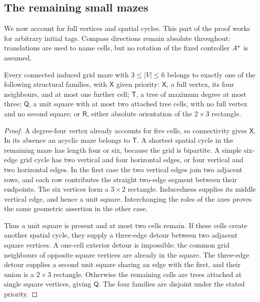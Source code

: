 \subsection{The remaining small mazes}\label{sec:cyclic}

We now account for full vertices and spatial cycles. This part of the proof
works for arbitrary initial tags. Compass directions remain absolute
throughout: translations are used to name cells, but no rotation of the fixed
controller \(A^{\star}\) is assumed.

\begin{lemma}\label{c:geometry}
Every connected induced grid maze with \(3\le |V|\le6\) belongs to exactly one
of the following structural families, with \(\mathsf X\) given priority:
\(\mathsf X\), a full vertex, its four neighbours, and at most one further
cell; \(\mathsf T\), a tree of maximum degree at most three;
\(\mathsf Q\), a unit square with at most two attached tree cells, with no
full vertex and no second square; or \(\mathsf R\), either absolute
orientation of the \(2\times3\) rectangle.
\end{lemma}
\begin{proof}
A degree-four vertex already accounts for five cells, so connectivity gives
\(\mathsf X\). In its absence an acyclic maze belongs to \(\mathsf T\).
A shortest spatial cycle in the remaining maze has length four or six,
because the grid is bipartite. A simple six-edge grid cycle has two vertical
and four horizontal edges, or four vertical and two horizontal edges. In the
first case the two vertical edges join two adjacent rows, and each row
contributes the straight two-edge segment between their endpoints. The six
vertices form a \(3\times2\) rectangle. Inducedness supplies its middle
vertical edge, and hence a unit square. Interchanging the roles of the axes
proves the same geometric assertion in the other case.

Thus a unit square is present and at most two cells remain. If these cells
create another spatial cycle, they supply a three-edge detour between two
adjacent square vertices. A one-cell exterior detour is impossible: the
common grid neighbours of opposite square vertices are already in the
square. The three-edge detour supplies a second unit square sharing an
edge with the first, and their union is a \(2\times3\) rectangle. Otherwise
the remaining cells are trees attached at single square vertices, giving
\(\mathsf Q\). The four families are disjoint under the stated priority.
\end{proof}


